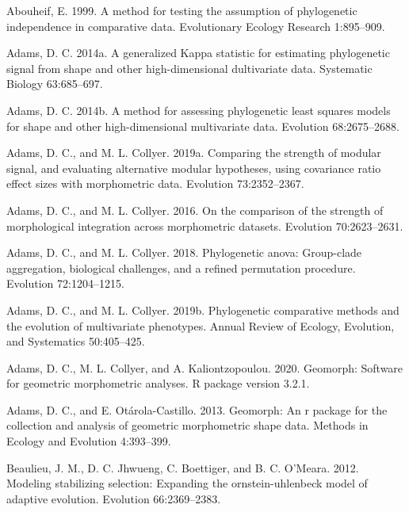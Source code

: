 \documentclass[
]{article}
\begin{document}
\hypertarget{refs}{}
\leavevmode\hypertarget{ref-Abouheif1999}{}%
Abouheif, E. 1999. A method for testing the assumption of phylogenetic
independence in comparative data. Evolutionary Ecology Research
1:895--909.

\leavevmode\hypertarget{ref-Adams2014a}{}%
Adams, D. C. 2014a. A generalized Kappa statistic for estimating
phylogenetic signal from shape and other high-dimensional dultivariate
data. Systematic Biology 63:685--697.

\leavevmode\hypertarget{ref-Adams2014b}{}%
Adams, D. C. 2014b. A method for assessing phylogenetic least squares
models for shape and other high-dimensional multivariate data. Evolution
68:2675--2688.

\leavevmode\hypertarget{ref-AdamsCollyer2019b}{}%
Adams, D. C., and M. L. Collyer. 2019a. Comparing the strength of
modular signal, and evaluating alternative modular hypotheses, using
covariance ratio effect sizes with morphometric data. Evolution
73:2352--2367.

\leavevmode\hypertarget{ref-AdamsCollyer2016}{}%
Adams, D. C., and M. L. Collyer. 2016. On the comparison of the strength
of morphological integration across morphometric datasets. Evolution
70:2623--2631.

\leavevmode\hypertarget{ref-AdamsCollyer2018b}{}%
Adams, D. C., and M. L. Collyer. 2018. Phylogenetic anova: Group-clade
aggregation, biological challenges, and a refined permutation procedure.
Evolution 72:1204--1215.

\leavevmode\hypertarget{ref-AdamsCollyer2019}{}%
Adams, D. C., and M. L. Collyer. 2019b. Phylogenetic comparative methods
and the evolution of multivariate phenotypes. Annual Review of Ecology,
Evolution, and Systematics 50:405--425.

\leavevmode\hypertarget{ref-AdamsGeomorph}{}%
Adams, D. C., M. L. Collyer, and A. Kaliontzopoulou. 2020. Geomorph:
Software for geometric morphometric analyses. R package version 3.2.1.

\leavevmode\hypertarget{ref-AdamsOtarola2013}{}%
Adams, D. C., and E. Otárola-Castillo. 2013. Geomorph: An r package for
the collection and analysis of geometric morphometric shape data.
Methods in Ecology and Evolution 4:393--399.

\leavevmode\hypertarget{ref-Beaulieu_et_al2012}{}%
Beaulieu, J. M., D. C. Jhwueng, C. Boettiger, and B. C. O'Meara. 2012.
Modeling stabilizing selection: Expanding the ornstein-uhlenbeck model
of adaptive evolution. Evolution 66:2369--2383.
\end{document}
